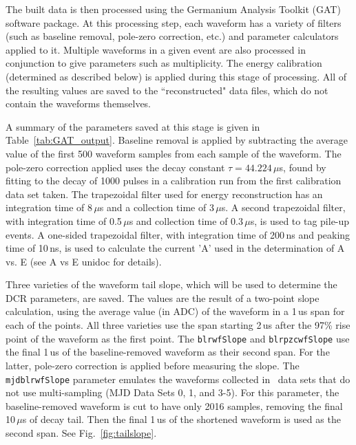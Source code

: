 \documentclass[groupedaddress,rmp,amsmath,amssymb,bibnotes,altaffilletter,twocolumn]{revtex4-1}
\begin{document}
The built data is then processed using the Germanium Analysis Toolkit (GAT) software package. At this processing step, each waveform has a variety of filters (such as baseline removal, pole-zero correction, etc.) and parameter calculators applied to it. Multiple waveforms in a given event are also processed in conjunction to give parameters such as multiplicity. The energy calibration (determined as described below) is applied during this stage of processing. All of the resulting values are saved to the ``reconstructed" data files, which do not contain the waveforms themselves. 

A summary of the parameters saved at this stage is given in Table~\ref{tab:GAT_output}. Baseline removal is applied by subtracting the average value of the first 500 waveform samples from each sample of the waveform. The pole-zero correction applied uses the decay constant $\tau = 44.224\,\mu$s, found by fitting to the decay of 1000 pulses in a calibration run from the first calibration data set taken. The trapezoidal filter used for energy reconstruction has an integration time of 8\,$\mu$s and a collection time of 3\,$\mu$s. A second trapezoidal filter, with integration time of 0.5\,$\mu$s and collection time of 0.3\,$\mu$s, is used to tag pile-up events. A one-sided trapezoidal filter, with integration time of 200\,ns and peaking time of 10\,ns, is used to calculate the current 'A' used in the determination of A vs. E (see A vs E unidoc for details). 

Three varieties of the waveform tail slope, which will be used to determine the DCR parameters, are saved. The values are the result of a two-point slope calculation, using the average value (in ADC) of the waveform in a 1\,us span for each of the points. All three varieties use the span starting 2\,us after the 97\% rise point of the waveform as the first point. The {\tt blrwfSlope} and {\tt blrpzcwfSlope} use the final 1\,us of the baseline-removed waveform as their second span. For the latter, pole-zero correction is applied before measuring the slope. The {\tt mjdblrwfSlope} parameter emulates the waveforms collected in \MJ\ data sets that do not use multi-sampling (MJD Data Sets 0, 1, and 3-5). For this parameter, the baseline-removed waveform is cut to have only 2016 samples, removing the final 10\,$\mu$s of decay tail. Then the final 1\,us of the shortened waveform is used as the second span. See Fig.~\ref{fig:tailslope}.
\end{document}
